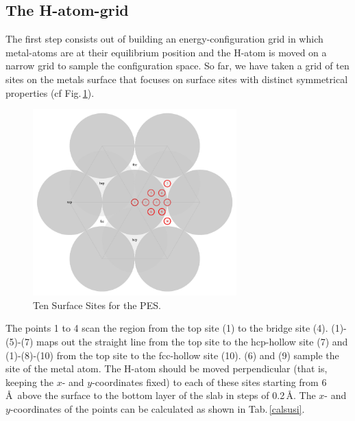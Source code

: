 \documentclass[11pt,oneside,a4paper, captions=nooneline, headsepline]{article}%
\begin{document}
\subsection{The H-atom-grid}
The first step consists out of building an energy-configuration grid in which metal-atoms are at their equilibrium position and the H-atom is moved on a narrow grid to sample the configuration space. So far, we have taken a grid of ten sites on the metals surface that focuses on surface sites with distinct symmetrical properties (cf Fig.\,\ref{surfacesites}).
\begin{figure}[h!!]
\centering
\includegraphics[width=0.7\textwidth]{SurfaceSites}
\caption{Ten Surface Sites for the PES.}
\label{surfacesites}
\end{figure}
The points 1 to 4 scan the region from the top site (1) to the bridge site (4). (1)-(5)-(7) maps out the straight line from the top site to the hcp-hollow site (7) and (1)-(8)-(10) from the top site to the fcc-hollow site (10). (6) and (9) sample the site of the metal atom. The H-atom should be moved perpendicular (that is, keeping the $x$- and $y$-coordinates fixed) to each of these sites starting from 6\,\AA~above the surface to the bottom layer of the slab in steps of 0.2\,\AA. The $x$- and $y$-coordinates of the points can be calculated as shown in Tab.\,\ref{calsusi}.
\end{document}
